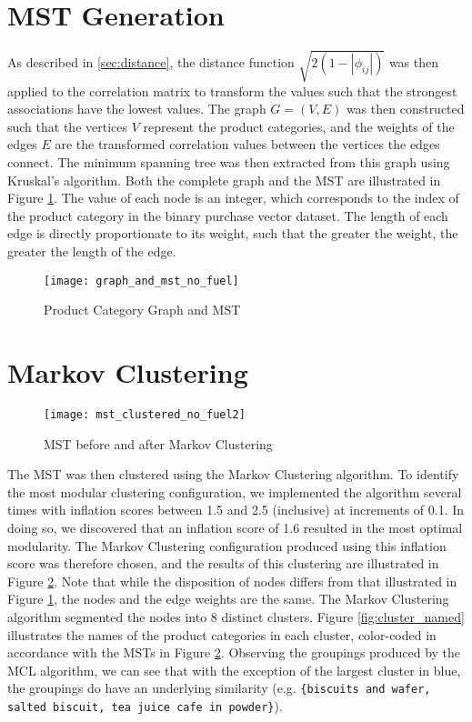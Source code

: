 \section{MST Generation}
As described in \ref{sec:distance}, the distance function $\sqrt{2(1-|\phi_{ij}|)}$ was then applied to the correlation matrix to transform the values such that the strongest associations have the lowest values. The graph $G=(V,E)$ was then constructed such that the vertices $V$ represent the product categories, and the weights of the edges $E$ are the transformed correlation values between the vertices the edges connect. The minimum spanning tree was then extracted from this graph using Kruskal's algorithm. Both the complete graph and the MST are illustrated in Figure \ref{fig:graph_mst}. The value of each node is an integer, which corresponds to the index of the product category in the binary purchase vector dataset. The length of each edge is directly proportionate to its weight, such that the greater the weight, the greater the length of the edge.
\begin{figure}[H]
\centering
\texttt{[image: graph\_and\_mst\_no\_fuel]}
\caption{Product Category Graph and MST}
\label{fig:graph_mst}
\end{figure}

\section{Markov Clustering}
\begin{figure}[H]
\centering
\texttt{[image: mst\_clustered\_no\_fuel2]}
\caption{MST before and after Markov Clustering}
\label{fig:clustered}
\end{figure}
The MST was then clustered using the Markov Clustering algorithm. To identify the most modular clustering configuration, we implemented the algorithm several times with inflation scores between 1.5 and 2.5 (inclusive) at increments of 0.1. In doing so, we discovered that an inflation score of 1.6 resulted in the most optimal modularity. The Markov Clustering configuration produced using this inflation score was therefore chosen, and the results of this clustering are illustrated in Figure \ref{fig:clustered}. Note that while the disposition of nodes differs from that illustrated in Figure \ref{fig:graph_mst}, the nodes and the edge weights are the same.
The Markov Clustering algorithm segmented the nodes into 8 distinct clusters.
Figure \ref{fig:cluster_named} illustrates the names of the product categories in each cluster, color-coded in accordance with the MSTs in Figure \ref{fig:clustered}. Observing the groupings produced by the MCL algorithm, we can see that with the exception of the largest cluster in blue, the groupings do have an underlying similarity (e.g. \texttt{\{biscuits and wafer, salted biscuit, tea juice cafe in powder\}}).

